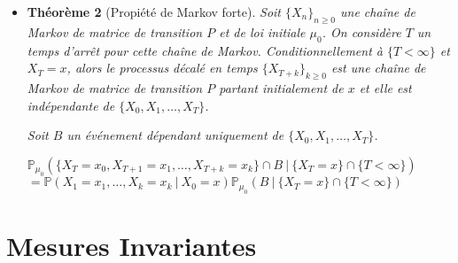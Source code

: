 \documentclass[10pt,a4paper,oneside]{article}
\newtheorem{theoreme}{Théorème}
\begin{document}
\begin{itemize}
\begin{theoreme}
\[ \mathbb{P}(A \cap B | X_n = x_n) = \mathbb{P}(A | X_n = x_n)\ \mathbb{P}(B | X_n = x_n) \]
\end{theoreme}

\item
\begin{theoreme}[Propiété de Markov forte]
Soit $\{ X_n \}_{n \geq 0}$ une chaîne de Markov de matrice de transition $P$ et de loi initiale $\mu_0$. On considère $T$ un temps d'arrêt pour cette chaîne de Markov. Conditionnellement à $\{ T < \infty \}$ et $X_T = x$, alors le processus décalé en temps $\{ X_{T + k} \}_{k \geq 0}$ est une chaîne de Markov de matrice de transition $P$ partant initialement de $x$ et elle est indépendante de $\{ X_0,X_1,\ldots,X_T \}$.

Soit $B$ un événement dépendant uniquement de $\{ X_0,X_1,\ldots,X_T \}$.

\begin{center}
$\mathbb{P}_{\mu_0}(\{ X_T = x_0,X_{T + 1} = x_1,\ldots,X_{T + k} = x_k \} \cap B\ |\ \{X_T = x\} \cap \{T < \infty\})$
$= \mathbb{P}(X_1 = x_1,\ldots,X_k = x_k\ |\ X_0 = x) \mathbb{P}_{\mu_0}(B\ |\ \{X_T = x\} \cap \{T < \infty\})$
\end{center}
\end{theoreme}
\end{itemize}

\section{Mesures Invariantes}
\end{document}

